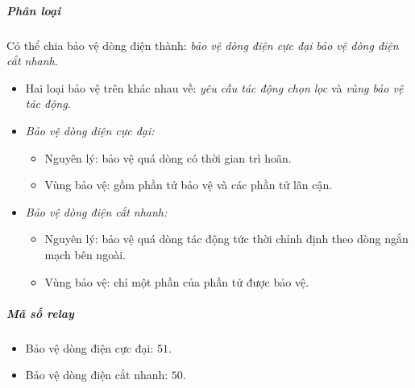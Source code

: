 \documentclass[12pt,a4paper]{article}
\begin{document}
	\subparagraph{Phân loại} Có thể chia bảo vệ dòng điện thành: \emph{bảo vệ dòng điện cực đại} \emph{bảo vệ dòng điện cắt nhanh}.
		\begin{itemize}
			\item Hai loại bảo vệ trên khác nhau về: \emph{yêu cầu tác động chọn lọc} và \emph{vùng bảo vệ tác động}.
			
			\item \emph{Bảo vệ dòng điện cực đại:}
				\begin{itemize}
					\item Nguyên lý: bảo vệ quá dòng có thời gian trì hoãn.
					
					\item Vùng bảo vệ: gồm phần tử bảo vệ và các phần tử lân cận.
				\end{itemize}
				
			\item \emph{Bảo vệ dòng điện cắt nhanh:}
				\begin{itemize}
					\item Nguyên lý: bảo vệ quá dòng tác động tức thời chỉnh định theo dòng ngắn mạch bên ngoài.
					
					\item Vùng bảo vệ: chỉ một phần của phần tử được bảo vệ.
				\end{itemize}
		\end{itemize}
		
	\subparagraph{Mã số relay}
		\begin{itemize}
			\item Bảo vệ dòng điện cực đại: $51$.
			\item Bảo vệ dòng điện cắt nhanh: $50$.
		\end{itemize}
		
\end{document}
